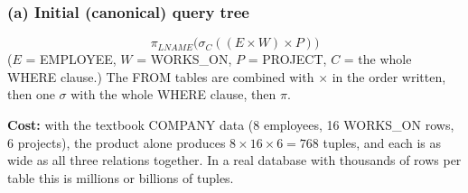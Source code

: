 \documentclass[10pt,a4paper]{article}
\newcommand{\aq}{\text{'Aquarius'}}
\newcommand{\bd}{\text{'1957-12-31'}}
\begin{document}
\subsubsection*{(a) Initial (canonical) query tree}
\begin{minipage}[c]{0.46\linewidth}\centering
{}
\end{minipage}\hfill
\begin{minipage}[c]{0.5\linewidth}
\[ \pi_{LNAME}\big(\sigma_{C}((E \times W) \times P)\big) \]
($E$ = EMPLOYEE, $W$ = WORKS\_ON, $P$ = PROJECT, $C$ = the whole WHERE clause.)
The FROM tables are combined with $\times$ in the order written, then one $\sigma$ with the whole WHERE clause, then $\pi$.

\textbf{Cost:} with the textbook COMPANY data (8 employees, 16 WORKS\_ON rows, 6 projects), the product alone produces $8 \times 16 \times 6 = 768$ tuples, and each is as wide as all three relations together. In a real database with thousands of rows per table this is millions or billions of tuples.
\end{minipage}
\end{document}
